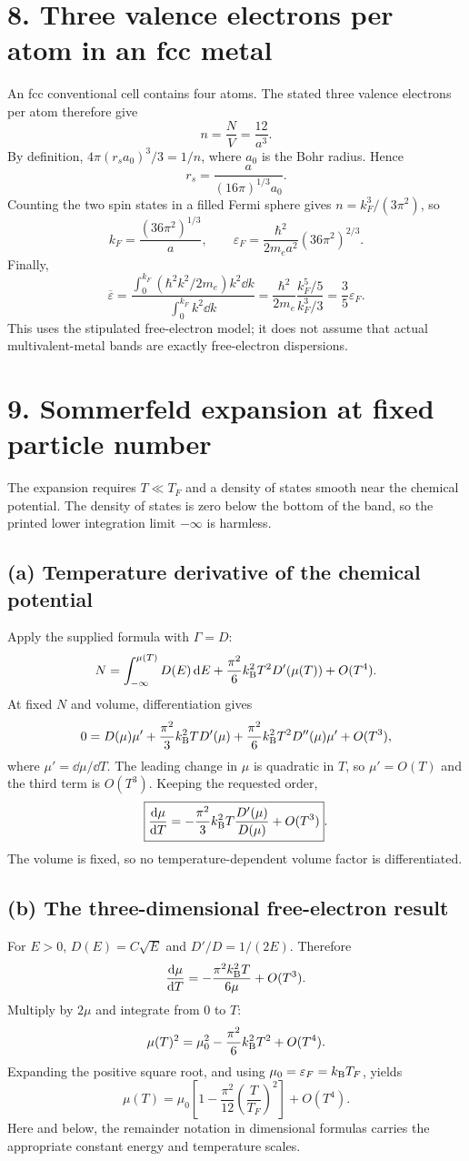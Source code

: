 \section*{8. Three valence electrons per atom in an fcc metal}
An fcc conventional cell contains four atoms. The stated three valence electrons per atom therefore give
\[
n=\frac NV=\frac{12}{a^3}.
\]
By definition, $4\pi(r_sa_0)^3/3=1/n$, where $a_0$ is the Bohr radius. Hence
\[
\boxed{r_s=\frac{a}{(16\pi)^{1/3}a_0}}.
\]
Counting the two spin states in a filled Fermi sphere gives
$n=k_F^3/(3\pi^2)$, so
\[
\boxed{k_F=\frac{(36\pi^2)^{1/3}}a},\qquad
\boxed{\varepsilon_F=\frac{\hbar^2}{2m_ea^2}(36\pi^2)^{2/3}}.
\]
Finally,
\[
\overline\varepsilon
=\frac{\int_0^{k_F}(\hbar^2k^2/2m_e)k^2\dd k}
{\int_0^{k_F}k^2\dd k}
=\frac{\hbar^2}{2m_e}\frac{k_F^5/5}{k_F^3/3}
=\boxed{\frac35\varepsilon_F}.
\]
This uses the stipulated free-electron model; it does not assume that actual multivalent-metal bands are exactly free-electron dispersions.

\section*{9. Sommerfeld expansion at fixed particle number}
The expansion requires $T\ll T_F$ and a density of states smooth near the chemical potential. The density of states is zero below the bottom of the band, so the printed lower integration limit $-\infty$ is harmless.

\subsection*{(a) Temperature derivative of the chemical potential}
Apply the supplied formula with $\Gamma=D$:
\[
N=\int_{-\infty}^{\mu(T)}D(E)\mathop{}\!\mathrm{d} E
+\frac{\pi^2}{6}k_{\mathrm B}^2T^2D'(\mu(T))+O(T^4).
\]
At fixed $N$ and volume, differentiation gives
\[
0=D(\mu)\mu'
+\frac{\pi^2}{3}k_{\mathrm B}^2T D'(\mu)
+\frac{\pi^2}{6}k_{\mathrm B}^2T^2D''(\mu)\mu'+O(T^3),
\]
where $\mu'=\dd\mu/\dd T$. The leading change in $\mu$ is quadratic in $T$, so $\mu'=O(T)$ and the third term is $O(T^3)$. Keeping the requested order,
\[
\boxed{\frac{\mathop{}\!\mathrm{d}\mu}{\mathop{}\!\mathrm{d} T}
=-\frac{\pi^2}{3}k_{\mathrm B}^2T\frac{D'(\mu)}{D(\mu)}+O(T^3)}.
\]
The volume is fixed, so no temperature-dependent volume factor is differentiated.

\subsection*{(b) The three-dimensional free-electron result}
For $E>0$, $D(E)=C\sqrt E$ and $D'/D=1/(2E)$. Therefore
\[
\frac{\mathop{}\!\mathrm{d}\mu}{\mathop{}\!\mathrm{d} T}=-\frac{\pi^2k_{\mathrm B}^2T}{6\mu}+O(T^3).
\]
Multiply by $2\mu$ and integrate from $0$ to $T$:
\[
\mu(T)^2=\mu_0^2-\frac{\pi^2}{6}k_{\mathrm B}^2T^2+O(T^4).
\]
Expanding the positive square root, and using $\mu_0=\varepsilon_F=k_{\mathrm B} T_F$, yields
\[
\boxed{\mu(T)=\mu_0\left[1-\frac{\pi^2}{12}
\left(\frac T{T_F}\right)^2\right]+O(T^4)}.
\]
Here and below, the remainder notation in dimensional formulas carries the appropriate constant energy and temperature scales.

